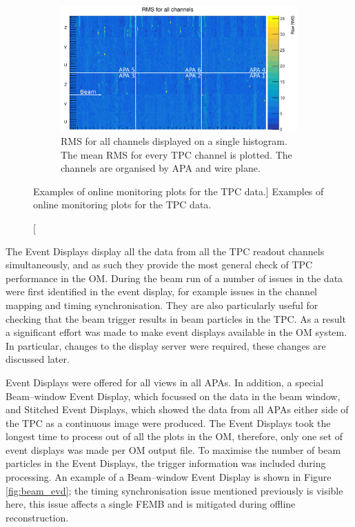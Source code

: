 \begin{figure}
	\begin{subfigure}[b]{0.75\textwidth}
		\centering
		\vspace{3mm}
		\includegraphics[width=\textwidth]{figures/all_chan_rms.png}
		\caption {RMS for all channels displayed on a single histogram. The mean RMS
		for every TPC channel is plotted. The channels are organised by APA and wire
		plane.} 
		\label{fig:ped_noise}
	\end{subfigure}

	\caption
	[Examples of online monitoring plots for the TPC data.]
	{Examples of online monitoring plots for the TPC data.}
	\label{fig:tpc_om}

\end{figure}

The Event Displays display all the data from all the TPC readout channels
simultaneously, and as such they provide the most general check of TPC 
performance in the OM. During the beam run of \protodune{} a number of issues in
the data were first identified in the event display, for example issues in the 
channel mapping and timing synchronisation. They are also particularly useful 
for checking that the beam trigger results in beam particles in the TPC. As 
a result a significant effort was made to make event displays available in 
the \protodune{} OM system. In particular, changes to the display server 
were required, these changes are discussed later. 

Event Displays were offered for all views in all APAs. In addition, a special 
Beam--window Event Display, which focussed on the data in the beam window, and 
Stitched Event Displays, which showed the data from all APAs either side of the
TPC as a continuous image were produced. The Event Displays took the longest 
time to process out of all the plots in the OM, therefore, only one set of 
event displays was made per OM output file. To maximise the number of beam 
particles in the Event Displays, the trigger information was included during 
processing. An example of a Beam--window Event Display is shown in Figure 
\ref{fig:beam_evd}; the timing synchronisation issue mentioned previously is 
visible here, this issue affects a single FEMB and is mitigated during offline 
reconstruction.  

